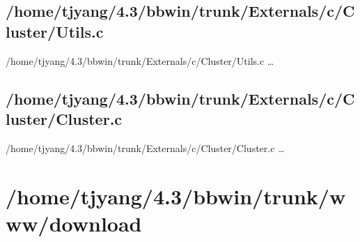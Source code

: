 \subsection{/home/tjyang/4.3/bbwin/trunk/Externals/c/Cluster/Utils.c}
\lstset{numberstyle=\tiny,numbers=left,
   breaklines=true,
   stepnumber=1,numbersep=5pt,firstnumber=1,
   xleftmargin=12pt,showstringspaces=false}
\noindent /home/tjyang/4.3/bbwin/trunk/Externals/c/Cluster/Utils.c  \ldots



\subsection{/home/tjyang/4.3/bbwin/trunk/Externals/c/Cluster/Cluster.c}
\lstset{numberstyle=\tiny,numbers=left,
   breaklines=true,
   stepnumber=1,numbersep=5pt,firstnumber=1,
   xleftmargin=12pt,showstringspaces=false}
\noindent /home/tjyang/4.3/bbwin/trunk/Externals/c/Cluster/Cluster.c  \ldots






\section{/home/tjyang/4.3/bbwin/trunk/www/download}

%
%
%
%
%

